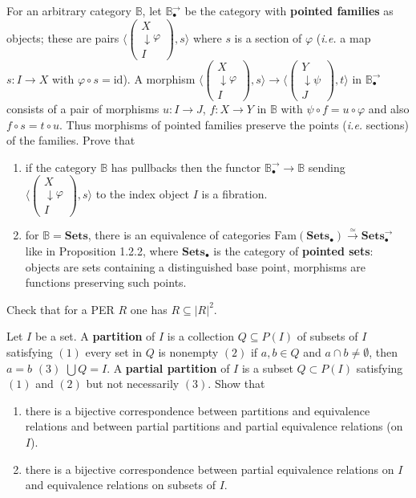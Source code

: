 \documentclass{report}
\newcommand{\bB}[0]{\mathbb B}
\newcommand{\fib}[3]{\begin{array}{l}#1 \\[-0.1cm] \downarrow #2 \\ #3\end{array}}
\newcommand{\idd}[0]{\mathrm{id}}
\newcommand{\Sets}[0]{\mathbf{Sets}}
\newcommand{\Fam}[0]{\mathrm{Fam}}
\begin{document}
\begin{exo}
    For an arbitrary category $\bB$, let $\bB^\to_\bullet$ be the category with \textbf{pointed families}
    as objects; these are pairs $\langle\left(\fib{X}{\varphi}{I}\right),s\rangle$ where $s$ is a section of
    $\varphi$ (\textit{i.e.} a map $s : I \to X$ with $\varphi\circ s = \idd$). A morphism $\langle
    \left(\fib{X}{\varphi}{I}\right),s\rangle \longrightarrow \langle \left(\fib{Y}{\psi}{J}\right),t\rangle$
    in $\bB^\to_\bullet$ consists of a pair of morphisms $u : I \to J$, $f : X \to Y$ in $\bB$ with $\psi 
    \circ f = u \circ \varphi$ and also $f \circ s = t \circ u$. Thus morphisms of pointed families preserve
    the points (\textit{i.e.} sections) of the families. Prove that
    \begin{enumerate}[label=(\roman*)]
        \item if the category $\bB$ has pullbacks then the functor $\bB^\to_\bullet \to \bB$ sending
        $\langle\left(\fib{X}{\varphi}{I}\right),s\rangle$ to the index object $I$ is a fibration.
        \item for $\bB = \Sets$, there is an equivalence of categories $\Fam(\Sets_\bullet)
        \overset{\simeq}{\to} \Sets^\to_\bullet$ like in Proposition 1.2.2, where $\Sets_\bullet$ is the
        category of \textbf{pointed sets}: objects are sets containing a distinguished base point, morphisms
        are functions preserving such points.
    \end{enumerate}
\end{exo}

\begin{exo}
    Check that for a PER $R$ one has $R\subseteq |R|^2$.
\end{exo}

\begin{exo}
    Let $I$ be a set. A \textbf{partition} of $I$ is a collection $Q\subseteq P(I)$ of subsets of $I$
    satisfying $(1)$ every set in $Q$ is nonempty $(2)$ if $a,b\in Q$ and $a\cap b \neq \emptyset$, then
    $a=b$ $(3)$ $\bigcup Q = I$. A \textbf{partial partition} of $I$ is a subset $Q\subset P(I)$ satisfying
    $(1)$ and $(2)$ but not necessarily $(3)$. Show that
    \begin{enumerate}[label=(\roman*)]
        \item there is a bijective correspondence between partitions and equivalence relations and between
        partial partitions and partial equivalence relations (on $I$).
        \item there is a bijective correspondence between partial equivalence relations on $I$ and
        equivalence relations on subsets of $I$.
    \end{enumerate}
\end{exo}
\end{document}

